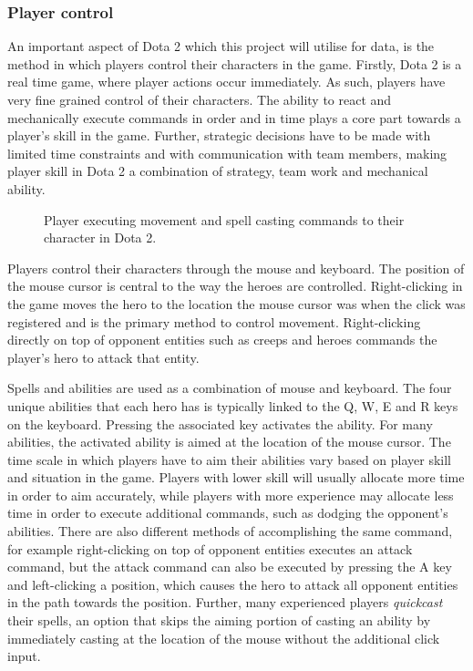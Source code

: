 \documentclass[Report.tex]{subfiles}
\begin{document}
\subsubsection{Player control}
An important aspect of Dota 2 which this project will utilise for data, is the method in which players control their characters in the game. Firstly, Dota 2 is a real time game, where player actions occur immediately. As such, players have very fine grained control of their characters. The ability to react and mechanically execute commands in order and in time plays a core part towards a player's skill in the game. Further, strategic decisions have to be made with limited time constraints and with communication with team members, making player skill in Dota 2 a combination of strategy, team work and mechanical ability. 

\begin{figure}[H]
\begin{subfigure}{0.4\textwidth}
\end{subfigure}
\hspace{\fill}
\begin{subfigure}{0.4\textwidth}
\end{subfigure}
\caption{Player executing movement and spell casting commands to their character in Dota 2.}
\end{figure}

Players control their characters through the mouse and keyboard. The position of the mouse cursor is central to the way the heroes are controlled. Right-clicking in the game moves the hero to the location the mouse cursor was when the click was registered and is the primary method to control movement. Right-clicking directly on top of opponent entities such as creeps and heroes commands the player's hero to attack that entity. 

Spells and abilities are used as a combination of mouse and keyboard. The four unique abilities that each hero has is typically linked to the Q, W, E and R keys on the keyboard. Pressing the associated key activates the ability. For many abilities, the activated ability is aimed at the location of the mouse cursor. The time scale in which players have to aim their abilities vary based on player skill and situation in the game. Players with lower skill will usually allocate more time in order to aim accurately, while players with more experience may allocate less time in order to execute additional commands, such as dodging the opponent's abilities. There are also different methods of accomplishing the same command, for example right-clicking on top of opponent entities executes an attack command, but the attack command can also be executed by pressing the A key and left-clicking a position, which causes the hero to attack all opponent entities in the path towards the position. Further, many experienced players \textit{quickcast} their spells, an option that skips the aiming portion of casting an ability by immediately casting at the location of the mouse without the additional click input. 
\end{document}
